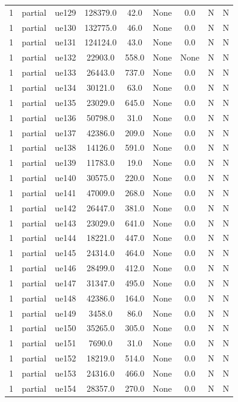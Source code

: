 \begin{table}[ht]
\begin{tabular}{|c|c|c|c|c|c|c|c|c|}
1 & partial & ue129 & 128379.0 & 42.0 & None & 0.0 & N & N \\
1 & partial & ue130 & 132775.0 & 46.0 & None & 0.0 & N & N \\
1 & partial & ue131 & 124124.0 & 43.0 & None & 0.0 & N & N \\
1 & partial & ue132 & 22903.0 & 558.0 & None & None & N & N \\
1 & partial & ue133 & 26443.0 & 737.0 & None & 0.0 & N & N \\
1 & partial & ue134 & 30121.0 & 63.0 & None & 0.0 & N & N \\
1 & partial & ue135 & 23029.0 & 645.0 & None & 0.0 & N & N \\
1 & partial & ue136 & 50798.0 & 31.0 & None & 0.0 & N & N \\
1 & partial & ue137 & 42386.0 & 209.0 & None & 0.0 & N & N \\
1 & partial & ue138 & 14126.0 & 591.0 & None & 0.0 & N & N \\
1 & partial & ue139 & 11783.0 & 19.0 & None & 0.0 & N & N \\
1 & partial & ue140 & 30575.0 & 220.0 & None & 0.0 & N & N \\
1 & partial & ue141 & 47009.0 & 268.0 & None & 0.0 & N & N \\
1 & partial & ue142 & 26447.0 & 381.0 & None & 0.0 & N & N \\
1 & partial & ue143 & 23029.0 & 641.0 & None & 0.0 & N & N \\
1 & partial & ue144 & 18221.0 & 447.0 & None & 0.0 & N & N \\
1 & partial & ue145 & 24314.0 & 464.0 & None & 0.0 & N & N \\
1 & partial & ue146 & 28499.0 & 412.0 & None & 0.0 & N & N \\
1 & partial & ue147 & 31347.0 & 495.0 & None & 0.0 & N & N \\
1 & partial & ue148 & 42386.0 & 164.0 & None & 0.0 & N & N \\
1 & partial & ue149 & 3458.0 & 86.0 & None & 0.0 & N & N \\
1 & partial & ue150 & 35265.0 & 305.0 & None & 0.0 & N & N \\
1 & partial & ue151 & 7690.0 & 31.0 & None & 0.0 & N & N \\
1 & partial & ue152 & 18219.0 & 514.0 & None & 0.0 & N & N \\
1 & partial & ue153 & 24316.0 & 466.0 & None & 0.0 & N & N \\
1 & partial & ue154 & 28357.0 & 270.0 & None & 0.0 & N & N \\

\end{tabular}
\end{table}
